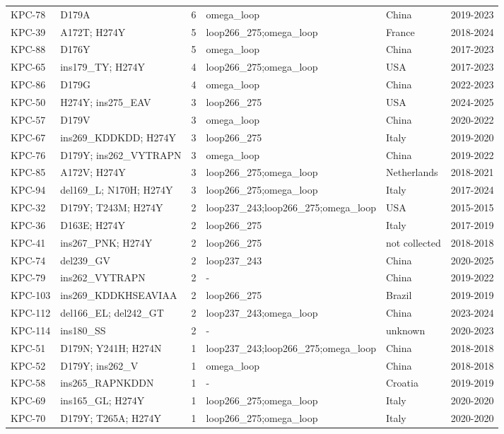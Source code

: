\begin{longtable}{@{}l p{5.2cm} r p{2.6cm} l l@{}}
KPC-78 & D179A & 6 & omega\_loop & China & 2019-2023 \\
KPC-39 & A172T; H274Y & 5 & loop266\_275;omega\_loop & France & 2018-2024 \\
KPC-88 & D176Y & 5 & omega\_loop & China & 2017-2023 \\
KPC-65 & ins179\_TY; H274Y & 4 & loop266\_275;omega\_loop & USA & 2017-2023 \\
KPC-86 & D179G & 4 & omega\_loop & China & 2022-2023 \\
KPC-50 & H274Y; ins275\_EAV & 3 & loop266\_275 & USA & 2024-2025 \\
KPC-57 & D179V & 3 & omega\_loop & China & 2020-2022 \\
KPC-67 & ins269\_KDDKDD; H274Y & 3 & loop266\_275 & Italy & 2019-2020 \\
KPC-76 & D179Y; ins262\_VYTRAPN & 3 & omega\_loop & China & 2019-2022 \\
KPC-85 & A172V; H274Y & 3 & loop266\_275;omega\_loop & Netherlands & 2018-2021 \\
KPC-94 & del169\_L; N170H; H274Y & 3 & loop266\_275;omega\_loop & Italy & 2017-2024 \\
KPC-32 & D179Y; T243M; H274Y & 2 & loop237\_243;loop266\_275;omega\_loop & USA & 2015-2015 \\
KPC-36 & D163E; H274Y & 2 & loop266\_275 & Italy & 2017-2019 \\
KPC-41 & ins267\_PNK; H274Y & 2 & loop266\_275 & not collected & 2018-2018 \\
KPC-74 & del239\_GV & 2 & loop237\_243 & China & 2020-2025 \\
KPC-79 & ins262\_VYTRAPN & 2 & - & China & 2019-2022 \\
KPC-103 & ins269\_KDDKHSEAVIAA & 2 & loop266\_275 & Brazil & 2019-2019 \\
KPC-112 & del166\_EL; del242\_GT & 2 & loop237\_243;omega\_loop & China & 2023-2024 \\
KPC-114 & ins180\_SS & 2 & - & unknown & 2020-2023 \\
KPC-51 & D179N; Y241H; H274N & 1 & loop237\_243;loop266\_275;omega\_loop & China & 2018-2018 \\
KPC-52 & D179Y; ins262\_V & 1 & omega\_loop & China & 2018-2018 \\
KPC-58 & ins265\_RAPNKDDN & 1 & - & Croatia & 2019-2019 \\
KPC-69 & ins165\_GL; H274Y & 1 & loop266\_275;omega\_loop & Italy & 2020-2020 \\
KPC-70 & D179Y; T265A; H274Y & 1 & loop266\_275;omega\_loop & Italy & 2020-2020 \\

\end{longtable}
